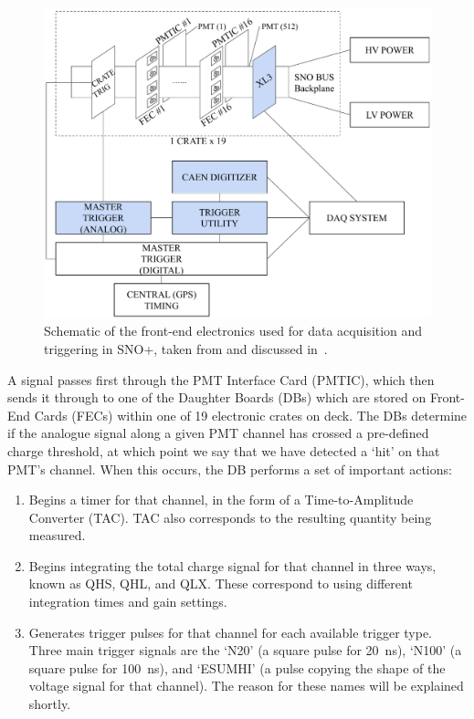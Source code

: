 \begin{figure}
    \centering
    \includegraphics[width=0.8\linewidth]{2_Detector/Figs/electronics_diagram.pdf}
    \caption[Schematic of the front-end electronics used for data acquisition and triggering in SNO+]{Schematic of the front-end electronics used for data acquisition and triggering in SNO+, taken from and discussed in~\cite{albaneseSNOExperiment2021}. %
    }
    \label{fig:tdaq_schematic}
\end{figure}

A signal passes first through the PMT Interface Card (PMTIC), which then sends it through to one of the Daughter Boards (DBs) which are stored on Front-End Cards (FECs) within one of 19 electronic crates on deck. The DBs determine if the analogue signal along a given PMT channel has crossed a pre-defined charge threshold, at which point we say that we have detected a `hit' on that PMT's channel. When this occurs, the DB performs a set of important actions:
\begin{enumerate}
    \item Begins a timer for that channel, in the form of a Time-to-Amplitude Converter (TAC). TAC also corresponds to the resulting quantity being measured.
    \item Begins integrating the total charge signal for that channel in three ways, known as QHS, QHL, and QLX. These correspond to using different integration times and gain settings.
    \item Generates trigger pulses for that channel for each available trigger type. Three main trigger signals are the `N20' (a square pulse for \SI{20}{\ns}), `N100' (a square pulse for \SI{100}{\ns}), and `ESUMHI' (a pulse copying the shape of the voltage signal for that channel). The reason for these names will be explained shortly.
\end{enumerate}

